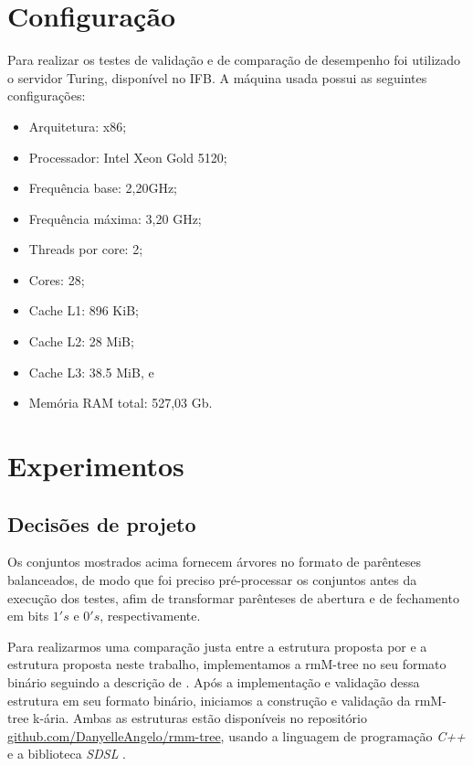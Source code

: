 \section{Configuração}\label{sec:configuracao}
Para realizar os testes de validação e de comparação de desempenho foi utilizado o servidor Turing, disponível no IFB. A máquina usada possui as seguintes configurações:
\begin{itemize}
    \item Arquitetura: x86;
    \item Processador: Intel Xeon Gold 5120;
    \item Frequência base: 2,20GHz;
    \item Frequência máxima: 3,20 GHz;
    \item Threads por core: 2;
    \item Cores: 28;
    \item Cache L1: 896 KiB;
    \item Cache L2: 28 MiB;
    \item Cache L3: 38.5 MiB, e
    \item Memória RAM total: 527,03 Gb.
\end{itemize}

\section{Experimentos}\label{sec:experimentos}
\subsection{Decisões de projeto}\label{subsec:decision}
Os conjuntos mostrados acima fornecem árvores no formato de parênteses balanceados, de modo que foi preciso pré-processar os conjuntos antes da execução dos testes, afim de transformar parênteses de abertura e de fechamento em bits $1's$ e $0's$, respectivamente.

Para realizarmos uma comparação justa entre a estrutura proposta por \citet{paper-fully-functinal-succint-trees} e a estrutura proposta neste trabalho,  implementamos a rmM-tree no seu formato binário seguindo a descrição de \citet{book-compact-data-structures}. Após a implementação e validação dessa estrutura em seu formato binário, iniciamos a construção e validação da rmM-tree k-ária. Ambas as estruturas estão disponíveis no repositório \href{https://github.com/DanyelleAngelo/rmm-tree}{github.com/DanyelleAngelo/rmm-tree}, usando a linguagem de programação \textit{C++} e a biblioteca \textit{SDSL} \citep{sdsl-article}. 

